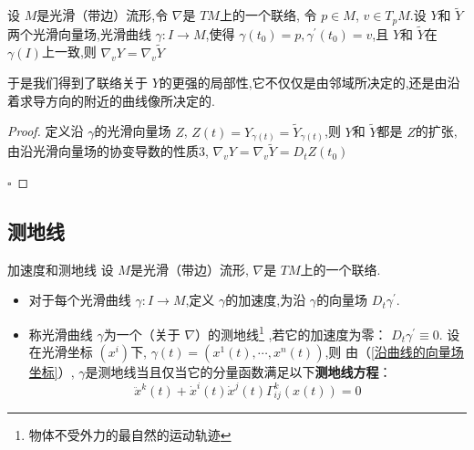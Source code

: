 \documentclass[../../几何与拓扑.tex]{subfiles}
\begin{document}
\begin{proposition}\label{pro:3.16-1}
    设 \(  M  \)是光滑（带边）流形,令 \(   \nabla   \)是 \(  TM  \)上的一个联络, 令 \(  p \in M  \), \(  v \in T_{p}M  \).设 \(  Y  \)和 \(  \tilde{Y}  \)两个光滑向量场,光滑曲线 \(   \gamma : I\to M  \),使得 \(   \gamma \left( t_0 \right)= p,  \gamma ^{\prime} \left( t_0 \right)= v    \),且 \(  Y  \)和 \(  \tilde{Y}  \)在 \(   \gamma \left( I \right)   \)上一致,则 \(   \nabla _{v}Y =   \nabla _{v}\tilde{Y}  \)      
\end{proposition}
\begin{remark}
    于是我们得到了联络关于 \(  Y  \)的更强的局部性,它不仅仅是由邻域所决定的,还是由沿着求导方向的附近的曲线像所决定的. 
\end{remark}
\begin{proof}
    定义沿 \(   \gamma   \)的光滑向量场 \(  Z   \), \(  Z\left( t \right) =  Y_{ \gamma \left( t \right) }= \tilde{Y}_{ \gamma \left( t \right) }   \),则 \(  Y  \)和 \(  \tilde{Y}  \)都是 \(  Z  \)的扩张,由沿光滑向量场的协变导数的性质3, \(   \nabla _{v}Y =   \nabla _{v}\tilde{Y} =  D_{t}Z\left( t_0 \right)   \)       

    \hfill $\square$
\end{proof}

\subsection{测地线}

\begin{definition}{加速度和测地线}
    设 \(  M  \)是光滑（带边）流形,  \(   \nabla   \)是 \(  TM  \)上的一个联络.
  \begin{itemize}
    \item   对于每个光滑曲线 \(   \gamma : I\to M  \),定义 \(   \gamma   \)的加速度,为沿 \(   \gamma   \)的向量场 \(  D_{t} \gamma ^{\prime}   \).
    \item 称光滑曲线 \(   \gamma   \)为一个（关于 \(   \nabla   \)）的测地线\footnote{物体不受外力的最自然的运动轨迹}  ,若它的加速度为零： \(  D_{t} \gamma ^{\prime} \equiv 0  \).
     设在光滑坐标 \(  \left( x^{i} \right)   \)下, \(   \gamma \left( t \right) =  \left( x^{1}\left( t \right),\cdots ,x^{n}\left( t \right)   \right)    \),则  由（\ref{沿曲线的向量场坐标}）,
      \(   \gamma   \)是测地线当且仅当它的分量函数满足以下\textbf{测地线方程}： \[
    \ddot{x}^{k}\left( t \right)+ \dot{x}^{i}\left( t \right)\dot{x}^{j}\left( t \right) \Gamma _{ij}^{k}\left( x\left( t \right)  \right)   = 0
      \] 
  \end{itemize}
  
\end{definition}
\end{document}
